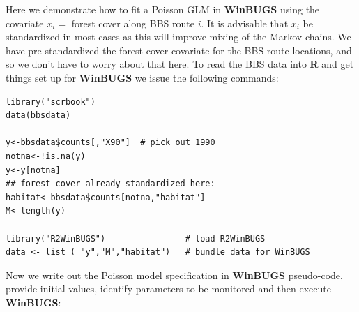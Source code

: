 Here we demonstrate how to fit a Poisson GLM in {\bf WinBUGS} using the
covariate $x_{i} =$ forest cover along BBS route $i$. It is advisable that $x_i$ be
standardized in most cases as this will improve mixing of the Markov
chains. We have pre-standardized the forest cover covariate for the
BBS route locations,
 and so we don't have to worry about that
here.  To read the BBS data into {\bf R} and get things set up for
{\bf WinBUGS}
we issue the following commands:
{\small
\begin{verbatim}
library("scrbook")
data(bbsdata)

y<-bbsdata$counts[,"X90"]  # pick out 1990
notna<-!is.na(y)
y<-y[notna]
## forest cover already standardized here:
habitat<-bbsdata$counts[notna,"habitat"]
M<-length(y)

library("R2WinBUGS")                # load R2WinBUGS
data <- list ( "y","M","habitat")   # bundle data for WinBUGS
\end{verbatim}
}
Now we write out the Poisson model specification in {\bf WinBUGS}
pseudo-code, provide initial values, identify parameters to be
monitored and then execute {\bf WinBUGS}:
